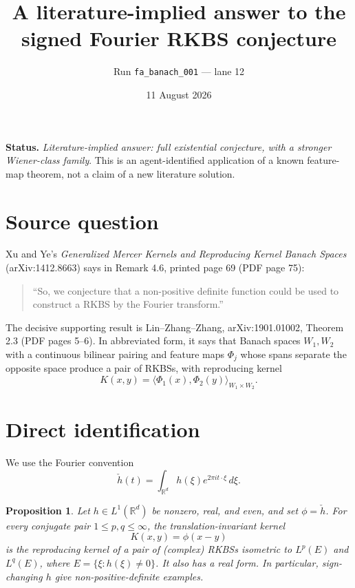 \documentclass[11pt]{article}
\title{A literature-implied answer to the signed Fourier RKBS conjecture}
\author{Run \texttt{fa\_banach\_001} --- lane 12}
\date{11 August 2026}
\newtheorem{proposition}{Proposition}
\newcommand{\R}{\mathbb R}
\begin{document}
\maketitle

\noindent\textbf{Status.}
\emph{Literature-implied answer: full existential conjecture, with a stronger
Wiener-class family}.  This is an agent-identified application of a known
feature-map theorem, not a claim of a new literature solution.

\section{Source question}

Xu and Ye's \emph{Generalized Mercer Kernels and Reproducing Kernel Banach
Spaces} (arXiv:1412.8663) says in Remark 4.6, printed page 69 (PDF page 75):
\begin{quote}
``So, we conjecture that a non-positive definite function could be used to
construct a RKBS by the Fourier transform.''
\end{quote}

The decisive supporting result is Lin--Zhang--Zhang,
arXiv:1901.01002, Theorem 2.3 (PDF pages 5--6).  In abbreviated form, it says
that Banach spaces $W_1,W_2$ with a continuous bilinear pairing and feature
maps $\Phi_j$ whose spans separate the opposite space produce a pair of
RKBSs, with reproducing kernel
\[
 K(x,y)=\langle\Phi_1(x),\Phi_2(y)\rangle_{W_1\times W_2}.
\]

\section{Direct identification}

We use the Fourier convention
\[
 \check h(t)=\int_{\R^d}h(\xi)e^{2\pi i t\cdot\xi}\,d\xi.
\]

\begin{proposition}
Let $h\in L^1(\R^d)$ be nonzero, real, and even, and set
$\phi=\check h$.  For every conjugate pair $1\le p,q\le\infty$, the
translation-invariant kernel
\[
 K(x,y)=\phi(x-y)
\]
is the reproducing kernel of a pair of (complex) RKBSs isometric to
$L^p(E)$ and $L^q(E)$, where $E=\{\xi:h(\xi)\ne0\}$.  It also has a real
form.  In particular, sign-changing $h$ give non-positive-definite examples.
\end{proposition}
\end{document}
